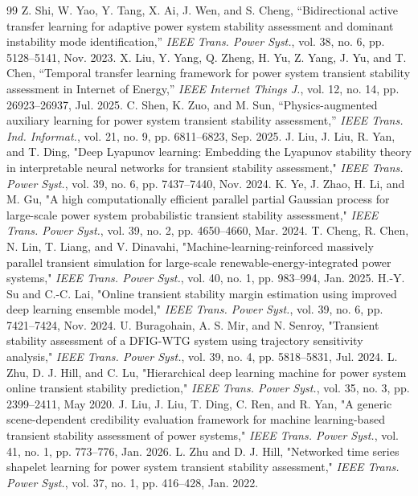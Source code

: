 \documentclass[conference]{IEEEtran}
\begin{document}
\begin{thebibliography}{99}
 Z. Shi, W. Yao, Y. Tang, X. Ai, J. Wen, and S. Cheng, ``Bidirectional active transfer learning for adaptive power system stability assessment and dominant instability mode identification,'' \emph{IEEE Trans. Power Syst.}, vol. 38, no. 6, pp. 5128--5141, Nov. 2023.
 X. Liu, Y. Yang, Q. Zheng, H. Yu, Z. Yang, J. Yu, and T. Chen, ``Temporal transfer learning framework for power system transient stability assessment in Internet of Energy,'' \emph{IEEE Internet Things J.}, vol. 12, no. 14, pp. 26923--26937, Jul. 2025.
 C. Shen, K. Zuo, and M. Sun, ``Physics-augmented auxiliary learning for power system transient stability assessment,'' \emph{IEEE Trans. Ind. Informat.}, vol. 21, no. 9, pp. 6811--6823, Sep. 2025.
 J. Liu, J. Liu, R. Yan, and T. Ding, "Deep Lyapunov learning: Embedding the Lyapunov stability theory in interpretable neural networks for transient stability assessment," \emph{IEEE Trans. Power Syst.}, vol. 39, no. 6, pp. 7437--7440, Nov. 2024.
 K. Ye, J. Zhao, H. Li, and M. Gu, "A high computationally efficient parallel partial Gaussian process for large-scale power system probabilistic transient stability assessment," \emph{IEEE Trans. Power Syst.}, vol. 39, no. 2, pp. 4650--4660, Mar. 2024.
 T. Cheng, R. Chen, N. Lin, T. Liang, and V. Dinavahi, "Machine-learning-reinforced massively parallel transient simulation for large-scale renewable-energy-integrated power systems," \emph{IEEE Trans. Power Syst.}, vol. 40, no. 1, pp. 983--994, Jan. 2025.
 H.-Y. Su and C.-C. Lai, "Online transient stability margin estimation using improved deep learning ensemble model," \emph{IEEE Trans. Power Syst.}, vol. 39, no. 6, pp. 7421--7424, Nov. 2024.
 U. Buragohain, A. S. Mir, and N. Senroy, "Transient stability assessment of a DFIG-WTG system using trajectory sensitivity analysis," \emph{IEEE Trans. Power Syst.}, vol. 39, no. 4, pp. 5818--5831, Jul. 2024.
 L. Zhu, D. J. Hill, and C. Lu, "Hierarchical deep learning machine for power system online transient stability prediction," \emph{IEEE Trans. Power Syst.}, vol. 35, no. 3, pp. 2399--2411, May 2020.
 J. Liu, J. Liu, T. Ding, C. Ren, and R. Yan, "A generic scene-dependent credibility evaluation framework for machine learning-based transient stability assessment of power systems," \emph{IEEE Trans. Power Syst.}, vol. 41, no. 1, pp. 773--776, Jan. 2026.
 L. Zhu and D. J. Hill, "Networked time series shapelet learning for power system transient stability assessment," \emph{IEEE Trans. Power Syst.}, vol. 37, no. 1, pp. 416--428, Jan. 2022.

\end{thebibliography}
\end{document}
